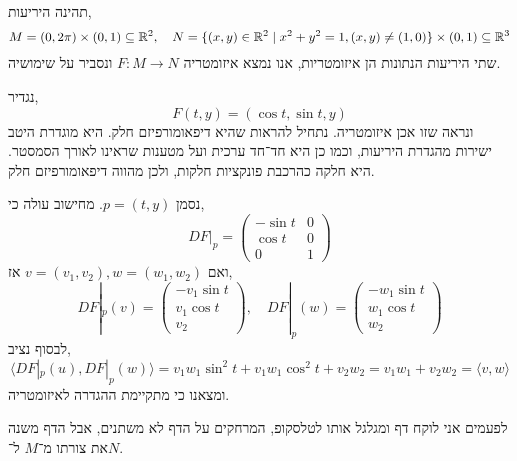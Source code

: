 \subquestion{}
תהינה היריעות,
\[
	M = (0, 2 \pi) \times (0, 1) \subseteq \mathbb{R}^2,
	\quad
	N = \{ (x, y) \in \mathbb{R}^2 \mid x^2 + y^2 = 1, (x, y) \ne (1, 0) \} \times (0, 1) \subseteq \mathbb{R}^3
\]
שתי היריעות הנתונות הן איזומטריות, אנו נמצא איזומטריה $F : M \to N$ ונסביר על שימושיה.
\begin{solution}
	נגדיר,
	\[
		F(t, y)
		= (\cos t, \sin t, y)
	\]
	ונראה שזו אכן איזומטריה.
	נתחיל להראות שהיא דיפאומורפיזם חלק.
	היא מוגדרת היטב ישירות מהגדרת היריעות, וכמו כן היא חד־חד ערכית ועל מטענות שראינו לאורך הסמסטר.
	היא חלקה כהרכבת פונקציות חלקות, ולכן מהווה דיפאומורפיזם חלק.

	נסמן $p = (t, y)$.
	מחישוב עולה כי,
	\[
		D F |_p
		= \begin{pmatrix}
			- \sin t & 0 \\
			\cos t & 0 \\
			0 & 1
		\end{pmatrix} 
	\]
	ואם $v = (v_1, v_2), w = (w_1, w_2)$ אז,
	\[
		D F |_{p}(v)
		= \begin{pmatrix} - v_1 \sin t \\ v_1 \cos t \\ v_2 \end{pmatrix},
		\quad
		D F |_{p}(w)
		= \begin{pmatrix} - w_1 \sin t \\ w_1 \cos t \\ w_2 \end{pmatrix}
	\]
	לבסוף נציב,
	\[
		\langle D F |_p(u), D F |_p(w) \rangle
		= v_1 w_1 \sin^2 t + v_1 w_1 \cos^2 t + v_2 w_2
		= v_1 w_1 + v_2 w_2
		= \langle v, w \rangle
	\]
	ומצאנו כי מתקיימת ההגדרה לאיזומטריה.

	לפעמים אני לוקח דף ומגלגל אותו לטלסקופ, המרחקים על הדף לא משתנים, אבל הדף משנה את צורתו מ־$M$ ל־$N$.
\end{solution}


